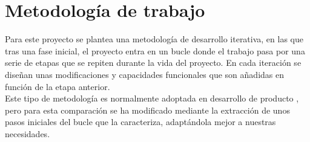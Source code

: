 \documentclass[11pt,a4paper,spanish]{book}
\begin{document}
	\section{Metodología de trabajo}
	Para este proyecto se plantea una metodología de desarrollo iterativa, en las que tras una fase inicial, el proyecto entra en un bucle donde el trabajo pasa por una serie de etapas que se repiten durante la vida del proyecto. En cada iteración se diseñan unas modificaciones y capacidades funcionales que son añadidas en función de la etapa anterior.\\
	Este tipo de metodología es normalmente adoptada en desarrollo de producto \cite{Larman2003}, pero para esta comparación se ha modificado mediante la extracción de unos pasos iniciales del bucle que la caracteriza, adaptándola mejor a nuestras necesidades.
	
\end{document}

